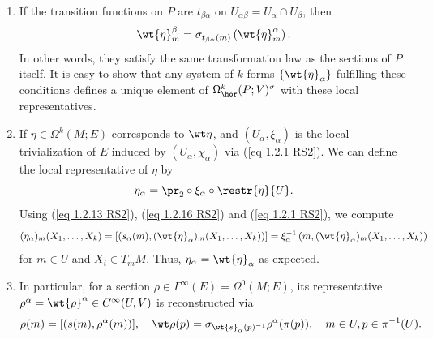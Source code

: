 \begin{rem}\label{rem 1.2.15 RS2}
    \begin{enumerate}
        \item If the transition functions on $P$ are $t_{\beta\alpha}$ on $U_{\alpha\beta}=U_\alpha\cap U_\beta$, then 
        \[\wt{\eta}_m^{\beta}=\sigma_{t_{\beta\alpha}(m)}\left(\wt{\eta}_m^{\alpha}\right). \label{eq transf law for hor forms}\]
        In other words, they satisfy the same transformation law as the sections of $P$ itself. It is easy to show that any system of $k$-forms $\{\wt{\eta}_\alpha\}$ fulfilling these conditions defines a unique element of $\Omega^k_{\hor}(P;V)^\sigma$ with these local representatives.
        
        \item If $\eta\in\Omega^k(M;E)$ corresponds to $\wt\eta$, and $(U_\alpha,\xi_\alpha)$ is the local trivialization of $E$ induced by $(U_\alpha,\chi_\alpha)$ via (\ref{eq 1.2.1 RS2}). We can define the local representative of $\eta$ by
        \[\eta_\alpha=\pr_2\circ\xi_\alpha\circ \restr{\eta}{U}.\]
        Using (\ref{eq 1.2.13 RS2}), (\ref{eq 1.2.16 RS2}) and (\ref{eq 1.2.1 RS2}), we compute 
        \[(\eta_\alpha)_m(X_1,\ldots,X_k)=\left[\left(s_\alpha(m),(\wt{\eta}_\alpha)_m(X_1,\ldots,X_k)\right)\right]=\xi_\alpha^{-1}\left(m,(\wt{\eta}_\alpha)_m(X_1,\ldots,X_k)\right)\]
        for $m\in U$ and $X_i\in T_mM$. Thus, $\eta_\alpha=\wt{\eta}_\alpha$ as expected.

        \item In particular, for a section $\rho \in\Gamma^\infty(E)=\Omega^0(M;E)$, its representative $\rho^\alpha=\wt{\rho}^\alpha\in C^\infty(U,V)$ is reconstructed via
        \[\rho(m)=[(s(m),\rho^\alpha(m))],\quad \wt\rho(p)=\sigma_{\wt{s}_\alpha(p)^{-1}}\rho^\alpha(\pi(p)),\quad m\in U,p\in\pi^{-1}(U).\]
    \end{enumerate}
\end{rem}


